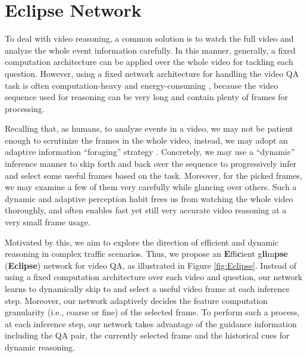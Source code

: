 \documentclass[final]{cvpr}
\begin{document}
\section{Eclipse Network}



To deal with video reasoning, a common solution is to watch the full video and analyze the whole event information carefully. In this manner, generally, a fixed computation architecture \cite{lei2018tvqa,jang2017tgif,arad2018compositional,Le_2020_CVPR} can be applied over the whole video for tackling each question. However, using a fixed network architecture for handling the video QA task is often computation-heavy and energy-consuming \cite{strubell2019energy,schwartz2019green}, because the video sequence used for reasoning can be very long and contain plenty of frames for processing.




Recalling that, as humans,
to analyze events in a video, we may not be patient enough to scrutinize the frames in the whole video,
instead, we may adopt an adaptive information ``foraging'' strategy  \cite{fitzsimmons2014skim,duggan2011skim}.
Concretely, we may 
use a ``dynamic'' inference manner 
to skip forth and back over the sequence to progressively infer and select some useful frames based on the task. Moreover, for the picked frames, we may examine a few of them very carefully while glancing over others. 
Such a dynamic and adaptive perception habit \cite{fitzsimmons2014skim,duggan2011skim} frees us from watching the whole video thoroughly, and often enables fast yet still very accurate video reasoning at a very small frame usage.


Motivated by this, we aim to explore the direction of efficient and dynamic reasoning in complex traffic scenarios. Thus, we propose an \textbf{E}ffi\textbf{c}ient g\textbf{li}m\textbf{pse} (\textbf{Eclipse}) network for video QA, as illustrated in Figure \ref{fig:Eclipse}.
Instead of using a fixed computation architecture over each video and question, our network learns to dynamically skip to and select a useful video frame at each inference step. Moreover, our network adaptively decides the feature computation granularity (i.e., coarse or fine) of the selected frame. To perform such a process, at each inference step, our network takes advantage of the guidance information including the QA pair, the currently selected frame and the historical cues for dynamic reasoning.
\end{document}
